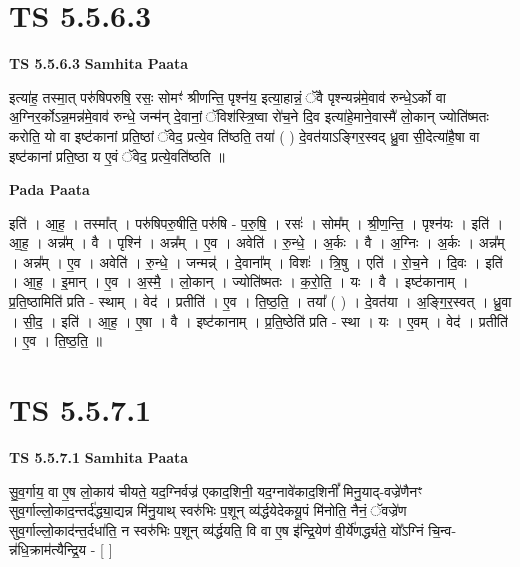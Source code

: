 \documentclass[17pt]{extarticle}
\begin{document}
\section*{ TS 5.5.6.3 }

\textbf{TS 5.5.6.3 } \newline
\textbf{Samhita Paata} \newline

इत्या॑ह॒ तस्मा॒त् परु॑षिपरुषि॒ रसः॒ सोमꣳ॑ श्रीणन्ति॒ पृश्न॑य॒ इत्या॒हान्नं॒ ॅवै पृश्न्यन्न॑मे॒वाव॑ रुन्धे॒ऽर्को वा अ॒ग्निर॒र्कोऽन्न॒मन्न॑मे॒वाव॑ रुन्धे॒ जन्म॑न् दे॒वानां॒ ॅविश॑स्त्रि॒ष्वा रो॑च॒ने दि॒व इत्या॑हे॒माने॒वास्मै॑ लो॒कान् ज्योति॑ष्मतः करोति॒ यो वा इष्ट॑कानां प्रति॒ष्ठां ॅवेद॒ प्रत्ये॒व ति॑ष्ठति॒ तया॑ ( ) दे॒वत॑याऽङ्गिर॒स्वद् ध्रु॒वा सी॒देत्या॑है॒षा वा इष्ट॑कानां प्रति॒ष्ठा य ए॒वं ॅवेद॒ प्रत्ये॒वति॑ष्ठति ॥ \newline

\textbf{Pada Paata} \newline

इति॑ । आ॒ह॒ । तस्मा᳚त् । परु॑षिपरु॒षीति॒ परु॑षि - प॒रु॒षि॒ । रसः॑ । सोम᳚म् । श्री॒ण॒न्ति॒ । पृश्न॑यः । इति॑ । आ॒ह॒ । अन्न᳚म् । वै । पृश्नि॑ । अन्न᳚म् । ए॒व । अवेति॑ । रु॒न्धे॒ । अ॒र्कः । वै । अ॒ग्निः । अ॒र्कः । अन्न᳚म् । अन्न᳚म् । ए॒व । अवेति॑ । रु॒न्धे॒ । जन्मन्न्॑ । दे॒वाना᳚म् । विशः॑ । त्रि॒षु । एति॑ । रो॒च॒ने । दि॒वः । इति॑ । आ॒ह॒ । इ॒मान् । ए॒व । अ॒स्मै॒ । लो॒कान् । ज्योति॑ष्मतः । क॒रो॒ति॒ । यः । वै । इष्ट॑कानाम् । प्र॒ति॒ष्ठामिति॑ प्रति - स्थाम् । वेद॑ । प्रतीति॑ । ए॒व । ति॒ष्ठ॒ति॒ । तया᳚ ( ) । दे॒वत॑या । अ॒ङ्गि॒र॒स्वत् । ध्रु॒वा । सी॒द॒ । इति॑ । आ॒ह॒ । ए॒षा । वै । इष्ट॑कानाम् । प्र॒ति॒ष्ठेति॑ प्रति - स्था । यः । ए॒वम् । वेद॑ । प्रतीति॑ । ए॒व । ति॒ष्ठ॒ति॒ ॥  \newline




\section*{ TS 5.5.7.1 }

\textbf{TS 5.5.7.1 } \newline
\textbf{Samhita Paata} \newline

सु॒व॒र्गाय॒ वा ए॒ष लो॒काय॑ चीयते॒ यद॒ग्निर्वज्र॑ एकाद॒शिनी॒ यद॒ग्नावे॑काद॒शिनीं᳚ मिनु॒याद्-वज्रे॑णैनꣳ सुव॒र्गाल्लो॒काद॒न्तर्द॑द्ध्या॒द्यन्न मि॑नु॒याथ् स्वरु॑भिः प॒शून् व्य॑र्द्धयेदेकयू॒पं मि॑नोति॒ नैनं॒ ॅवज्रे॑ण सुव॒र्गाल्लो॒काद॑न्त॒र्दधा॑ति॒ न स्वरु॑भिः प॒शून् व्य॑र्द्धयति॒ वि वा ए॒ष इ॑न्द्रि॒येण॑ वी॒र्ये॑णर्द्ध्यते॒ यो᳚ऽग्निं चि॒न्व-न्न॑धि॒क्राम॑त्यैन्द्रि॒य - [  ] \newline
\end{document}
